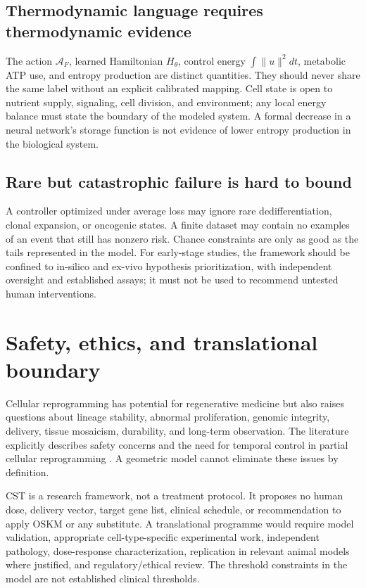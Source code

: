 \documentclass[11pt,a4paper]{article}
\theoremstyle{definition}
\theoremstyle{remark}
\begin{document}
\subsection{Thermodynamic language requires thermodynamic evidence}
The action $\mathcal{A}_F$, learned Hamiltonian $H_\theta$, control energy $\int\|u\|^2dt$, metabolic ATP use, and entropy production are distinct quantities. They should never share the same label without an explicit calibrated mapping. Cell state is open to nutrient supply, signaling, cell division, and environment; any local energy balance must state the boundary of the modeled system. A formal decrease in a neural network's storage function is not evidence of lower entropy production in the biological system.

\subsection{Rare but catastrophic failure is hard to bound}
A controller optimized under average loss may ignore rare dedifferentiation, clonal expansion, or oncogenic states. A finite dataset may contain no examples of an event that still has nonzero risk. Chance constraints are only as good as the tails represented in the model. For early-stage studies, the framework should be confined to in-silico and ex-vivo hypothesis prioritization, with independent oversight and established assays; it must not be used to recommend untested human interventions.

\section{Safety, ethics, and translational boundary}
Cellular reprogramming has potential for regenerative medicine but also raises questions about lineage stability, abnormal proliferation, genomic integrity, delivery, tissue mosaicism, durability, and long-term observation. The literature explicitly describes safety concerns and the need for temporal control in partial cellular reprogramming \cite{LongWinding2024,Avelar2025}. A geometric model cannot eliminate these issues by definition.

CST is a research framework, not a treatment protocol. It proposes no human dose, delivery vector, target gene list, clinical schedule, or recommendation to apply OSKM or any substitute. A translational programme would require model validation, appropriate cell-type-specific experimental work, independent pathology, dose-response characterization, replication in relevant animal models where justified, and regulatory/ethical review. The threshold constraints in the model are not established clinical thresholds.
\end{document}

